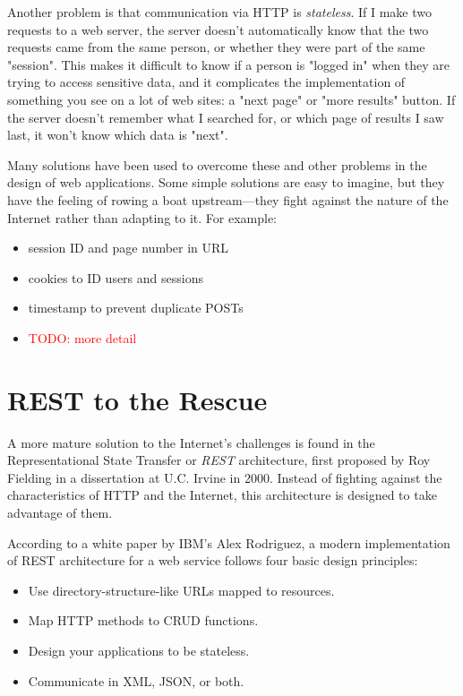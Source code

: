 \documentclass[11pt]{book}
\newcommand{\term}[1]{\emph{#1}} %
\newcommand{\todo}[1]{\textcolor{red}{TODO: #1}} %
\begin{document}
Another problem is that communication via HTTP is \term{stateless}.  If I make two requests to a web server, the server doesn't automatically know that the two requests came from the same person, or whether they were part of the same "session".  This makes it difficult to know if a person is "logged in" when they are trying to access sensitive data, and it complicates the implementation of something you see on a lot of web sites: a "next page" or "more results" button.  If the server doesn't remember what I searched for, or which page of results I saw last, it won't know which data is "next".

Many solutions have been used to overcome these and other problems in the design of web applications.  Some simple solutions are easy to imagine, but they have the feeling of rowing a boat upstream---they fight against the nature of the Internet rather than adapting to it.  For example:

\begin{itemize}
    \item session ID and page number in URL
    \item cookies to ID users and sessions
    \item timestamp to prevent duplicate POSTs
    \item \todo{more detail}
\end{itemize}

\section{REST to the Rescue}
A more mature solution to the Internet's challenges is found in the Representational State Transfer or \term{REST} architecture, first proposed by Roy Fielding in a dissertation at U.C. Irvine in 2000.  Instead of fighting against the characteristics of HTTP and the Internet, this architecture is designed to take advantage of them.

According to a white paper by IBM's Alex Rodriguez, a modern implementation of REST architecture for a web service follows four basic design principles:

\begin{itemize}
    \item Use directory-structure-like URLs mapped to resources.
    \item Map HTTP methods to CRUD functions.
    \item Design your applications to be stateless.
    \item Communicate in XML, JSON, or both.
\end{itemize}
\end{document}
